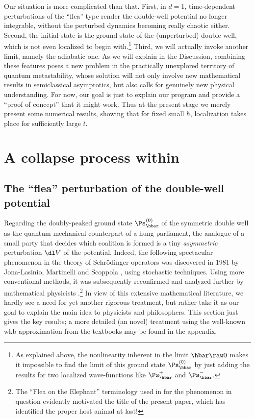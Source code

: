 \documentclass[12pt]{article}
\begin{document}
Our situation is more complicated than that. First,  in $d=1$,  time-dependent perturbations of the ``flea'' type render the double-well potential no longer integrable, without the perturbed dynamics becoming really chaotic either. Second, the initial state is the ground state of the (unperturbed) double well, which is not even localized to begin with.\footnote{As explained above, the nonlinearity inherent in the limit $\hbar\raw 0$ makes it impossible to find the limit of this ground state $\Ps^{(0)}_{\hbar}$  by just adding the results for two localized wave-functions like $\Ps^+_{\hbar}$ and $\Ps^-_{\hbar}$.}
Third, we will actually invoke another limit, namely the adiabatic one. As we will explain in the Discussion, combining these features poses a new problem in the practically unexplored territory of quantum metastability, whose solution will not only involve new mathematical results in 
semiclassical asymptotics, but also calls for genuinely new physical understanding. 
 For now, our goal is just to explain our program and provide a ``proof of concept'' that it might work. 
Thus at the present stage we merely present some numerical results, showing that for fixed small $\hbar$, localization takes place for sufficiently large $t$.
\section{A collapse process within \qm} \label{FE}
\subsection{The ``flea'' perturbation of the double-well potential}\label{sec3.1}
Regarding the doubly-peaked ground state $\Ps_{\hbar}^{(0)}$ of the  symmetric double well as the quantum-mechanical counterpart of a hung parliament, the analogue of a small party that decides which coalition is formed is a tiny \emph{asymmetric} perturbation $\dl V$ of the potential. Indeed, the following spectacular phenomenon in the theory of Schr\"{o}dinger operators was  discovered  in 1981 by Jona-Lasinio, Martinelli and Scoppola \cite{JLMS1,JLMS2}, using stochastic techniques.  Using more conventional methods, it was subsequently reconfirmed and analyzed further by  mathematical physicists  \cite{CDS2,GGJL,Helffer,HS,Simon4}.\footnote{The ``Flea on the Elephant'' terminology used in  \cite{Simon4} for the phenomenon in question evidently motivated the title of the present paper, which has identified the  proper host animal at last!}  In view of this extensive mathematical literature, we hardly see a need for yet another  rigorous treatment, but rather take it as our goal to explain the main idea to physicists and philosophers. This section just gives the key results; a more detailed (an novel) treatment using the well-known {\sc wkb} approximation from the textbooks may be found in the appendix. 
\end{document}
